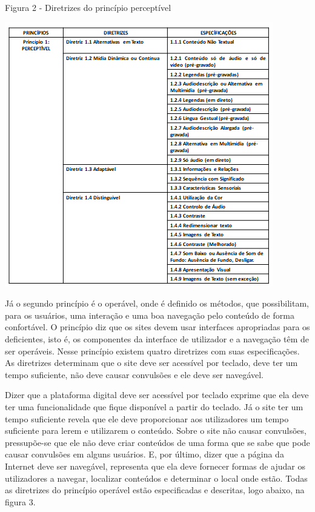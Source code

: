 \documentclass[a4paper]{article}
\begin{document}
\begin{titlepage}
Figura 2 - Diretrizes do princípio perceptível\\[-0.7cm]
\begin{center}
	\parbox{11cm}{\includegraphics[scale=0.9]{Perceptível.png}}
\end{center}

Já o segundo princípio é o operável, onde é definido os métodos, que possibilitam, para os usuários, uma interação e uma boa navegação pelo conteúdo de forma confortável. O princípio diz que os sites devem usar interfaces apropriadas para os deficientes, isto é, os componentes da interface de utilizador e a navegação têm de ser operáveis. Nesse princípio existem quatro diretrizes com suas especificações. As diretrizes determinam que o site deve ser acessível por teclado, deve ter um tempo suficiente, não deve causar convulsões e ele deve ser navegável.

Dizer que a plataforma digital deve ser acessível por teclado exprime que ela deve ter uma funcionalidade que fique disponível a partir do teclado. Já o site ter um tempo suficiente revela que ele deve proporcionar aos utilizadores um tempo suficiente para lerem e utilizarem o conteúdo. Sobre o site não causar convulsões, pressupõe-se que ele não deve criar conteúdos de uma forma que se sabe que pode causar convulsões em alguns usuários. E, por último, dizer que a página da Internet deve ser navegável, representa que ela deve fornecer formas de ajudar os utilizadores a navegar, localizar conteúdos e determinar o local onde estão. Todas as diretrizes do princípio operável estão especificadas e descritas, logo abaixo, na figura 3.\\


\end{titlepage}
\end{document}
